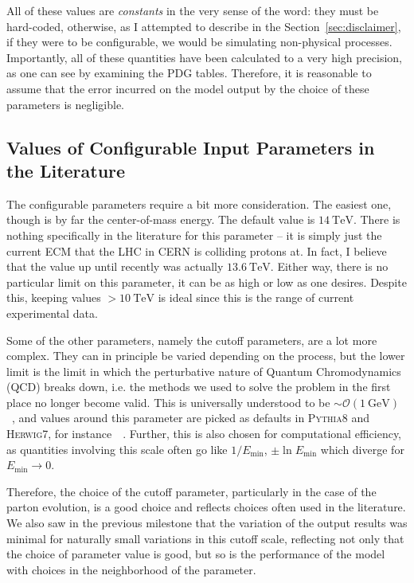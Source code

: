 All of these values are \textit{constants} in the very sense of the word: they must be hard-coded, otherwise, as I attempted to describe in the Section~\ref{sec:disclaimer}, if they were to be configurable, we would be simulating non-physical processes. Importantly, all of these quantities have been calculated to a very high precision, as one can see by examining the PDG tables. Therefore, it is reasonable to assume that the error incurred on the model output by the choice of these parameters is negligible.


\subsection{Values of Configurable Input Parameters in the Literature}

The configurable parameters require a bit more consideration. The easiest one, though is by far the center-of-mass energy. The default value is $\qty{14}{\tera\electronvolt}$. There is nothing specifically in the literature for this parameter -- it is simply just the current ECM that the LHC in CERN is colliding protons at. In fact, I believe that the value up until recently was actually $\qty{13.6}{\tera\electronvolt}$. Either way, there is no particular limit on this parameter, it can be as high or low as one desires. Despite this, keeping values $>\qty{10}{\tera\electronvolt}$ is ideal since this is the range of current experimental data.

Some of the other parameters, namely the cutoff parameters, are a lot more complex. They can in principle be varied depending on the process, but the lower limit is the limit in which the perturbative nature of Quantum Chromodynamics (QCD) breaks down, i.e. the methods we used to solve the problem in the first place no longer become valid. This is universally understood to be $\sim\mathcal{O}(\qty{1}{\giga\electronvolt})$~\cite{Hoang_2024}, and values around this parameter are picked as defaults in \textsc{Pythia8} and \textsc{Herwig7}, for instance~\cite{PYTHIA8DOC}~\cite{HERWIGDOCS}. Further, this is also chosen for computational efficiency, as quantities involving this scale often go like $1/E_{\mathrm{min}}$, $\pm\ln E_{\mathrm{min}}$ which diverge for $E_{\mathrm{min}} \rightarrow 0$.

Therefore, the choice of the cutoff parameter, particularly in the case of the parton evolution, is a good choice and reflects choices often used in the literature. We also saw in the previous milestone that the variation of the output results was minimal for naturally small variations in this cutoff scale, reflecting not only that the choice of parameter value is good, but so is the performance of the model with choices in the neighborhood of the parameter.


